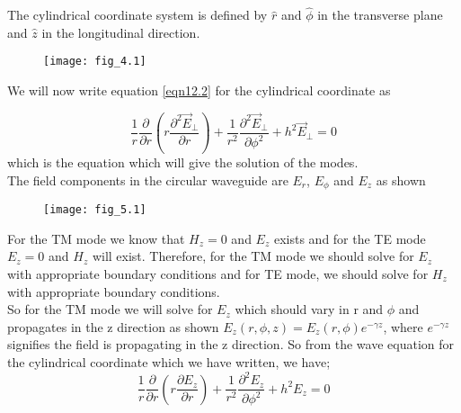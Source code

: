	 The cylindrical coordinate system is defined by $\hat{r}$ and $\hat{\phi}$ in the transverse plane and $\hat{z}$ in the longitudinal direction.
	   
	 \begin{figure}[H]
	   	\centering
	   	\texttt{[image: fig\_4.1]}
	   	\caption{}
	   	\label{fig:fig4}
	 \end{figure}
	   
	   
	 We will now write equation \ref{eqn12.2} for the cylindrical coordinate as 
	   
	 $$
	 \frac{1}{r}\frac{\partial}{\partial r}(r\frac{\partial^2\vec{E}_\bot}{\partial r}) + \frac{1}{r^2}\frac{\partial^2\vec{E}_\bot}{\partial\phi^2}+ h^2\vec{E}_\bot = 0 
	 $$
	 which is the equation which will give the solution of the modes. 
	 \\ The field components in the circular waveguide are $E_r$, $E_\phi$ and $E_z$ as shown
  
     \begin{figure}[H]
       	\centering
      	\texttt{[image: fig\_5.1]}
       	\caption{}
       	\label{fig:fig5}
     \end{figure}
   
	  For the TM mode we know that $H_z=0$ and $E_z$ exists and for the TE mode $E_z=0$ and $H_z$ will exist. Therefore, for the TM mode we should solve for $E_z$ with appropriate boundary conditions and for TE mode, we should solve for $H_z$ with appropriate boundary conditions. \\
	  
	  So for the TM mode we will solve for $E_z$ which should vary in r and $\phi$ and propagates in the z direction as shown $E_z(r,\phi, z)=E_z(r,\phi)e^{-\gamma z}$, where $e^{-\gamma z}$ signifies the field is propagating in the z direction. So from the wave equation for the cylindrical coordinate which we have written, we have;
	  \begin{equation}
	  	\frac{1}{r}\frac{\partial}{\partial r}(r\frac{\partial E_z}{\partial r}) + \frac{1}{r^2}\frac{\partial^2 E_z}{\partial\phi^2} + h^2 E_z = 0 
	  	\label{eqn12.3}
	  \end{equation}
	 
